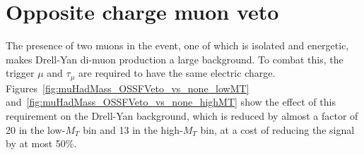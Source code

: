 \section{Opposite charge muon veto\label{sec:evtsel-OSSF}}

The presence of two muons in the event, one of which is isolated and energetic, makes Drell-Yan di-muon production a large background.  To combat this, the trigger $\mu$ and $\tau_{\mu}$ are required to have the same electric charge.  Figures~\ref{fig:muHadMass_OSSFVeto_vs_none_lowMT} and~\ref{fig:muHadMass_OSSFVeto_vs_none_highMT} show the effect of this requirement on the Drell-Yan background, which is reduced by almost a factor of 20 in the low-$M_{T}$ bin and 13 in the high-$M_{T}$ bin, at a cost of reducing the signal by at most 50\%.

